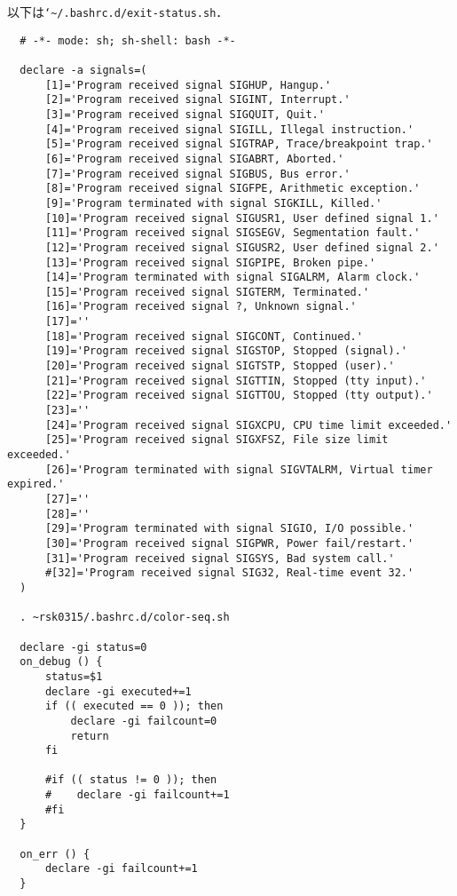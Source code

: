 \documentclass[a4paper]{jsarticle}
\begin{document}
以下は\texttt{\char`\~{}/.bashrc.d/exit-status.sh}．
\begin{lstlisting}
  # -*- mode: sh; sh-shell: bash -*-
  
  declare -a signals=(
      [1]='Program received signal SIGHUP, Hangup.'
      [2]='Program received signal SIGINT, Interrupt.'
      [3]='Program received signal SIGQUIT, Quit.'
      [4]='Program received signal SIGILL, Illegal instruction.'
      [5]='Program received signal SIGTRAP, Trace/breakpoint trap.'
      [6]='Program received signal SIGABRT, Aborted.'
      [7]='Program received signal SIGBUS, Bus error.'
      [8]='Program received signal SIGFPE, Arithmetic exception.'
      [9]='Program terminated with signal SIGKILL, Killed.'
      [10]='Program received signal SIGUSR1, User defined signal 1.'
      [11]='Program received signal SIGSEGV, Segmentation fault.'
      [12]='Program received signal SIGUSR2, User defined signal 2.'
      [13]='Program received signal SIGPIPE, Broken pipe.'
      [14]='Program terminated with signal SIGALRM, Alarm clock.'
      [15]='Program received signal SIGTERM, Terminated.'
      [16]='Program received signal ?, Unknown signal.'
      [17]=''
      [18]='Program received signal SIGCONT, Continued.'
      [19]='Program received signal SIGSTOP, Stopped (signal).'
      [20]='Program received signal SIGTSTP, Stopped (user).'
      [21]='Program received signal SIGTTIN, Stopped (tty input).'
      [22]='Program received signal SIGTTOU, Stopped (tty output).'
      [23]=''
      [24]='Program received signal SIGXCPU, CPU time limit exceeded.'
      [25]='Program received signal SIGXFSZ, File size limit exceeded.'
      [26]='Program terminated with signal SIGVTALRM, Virtual timer expired.'
      [27]=''
      [28]=''
      [29]='Program terminated with signal SIGIO, I/O possible.'
      [30]='Program received signal SIGPWR, Power fail/restart.'
      [31]='Program received signal SIGSYS, Bad system call.'
      #[32]='Program received signal SIG32, Real-time event 32.'
  )
  
  . ~rsk0315/.bashrc.d/color-seq.sh
  
  declare -gi status=0
  on_debug () {
      status=$1
      declare -gi executed+=1
      if (( executed == 0 )); then
          declare -gi failcount=0
          return
      fi
  
      #if (( status != 0 )); then
      #    declare -gi failcount+=1
      #fi
  }
  
  on_err () {
      declare -gi failcount+=1
  }
  

\end{lstlisting}
\end{document}
